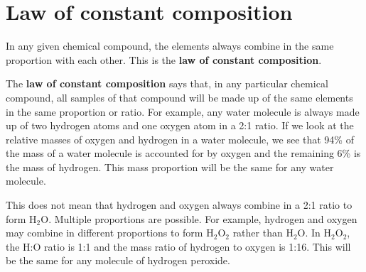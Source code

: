     \label{m38711*cid6}
            \section{Law of constant composition}
            \nopagebreak
      \label{m38711*id65065}In any given chemical compound, the elements always combine in the same proportion with each other. This is the \textbf{law of constant composition}.\par 
      \label{m38711*id65075}The \textbf{law of constant composition} says that, in any particular chemical compound, all samples of that compound will be made up of the same elements in the same proportion or ratio. For example, any water molecule is always made up of two hydrogen atoms and one oxygen atom in a 2:1 ratio. If we look at the relative masses of oxygen and hydrogen in a water molecule, we see that 94\% of the mass of a water molecule is accounted for by oxygen and the remaining 6\% is the mass of hydrogen. This mass proportion will be the same for any water molecule.\par 
      \label{m38711*id65089}This does not mean that hydrogen and oxygen always combine in a 2:1 ratio to form $\text{H}{}_{2}\text{O}$. Multiple proportions are possible. For example, hydrogen and oxygen may combine in different proportions to form $\text{H}{}_{2}\text{O}{}_{2}$ rather than $\text{H}{}_{2}\text{O}$. In $\text{H}{}_{2}\text{O}{}_{2}$, the H:O ratio is 1:1 and the mass ratio of hydrogen to oxygen is 1:16. This will be the same for any molecule of hydrogen peroxide.\par 
